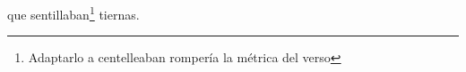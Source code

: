 que sentillaban\footnote{\textsuperscript{}Adaptarlo a centelleaban rompería la métrica del verso} tiernas.
